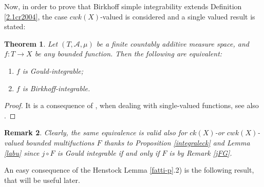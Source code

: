 \documentclass[11pt,a4paper,twoside]{amsart}
\newtheorem{theorem}{Theorem}[section]
\newtheorem{remark}[theorem]{Remark}
\begin{document}
Now,  in order to prove that Birkhoff simple integrability extends 
Definition \ref{2.1cr2004},
the  case $cwk(X)$-valued  is considered and  a single valued result is stated:
\begin{theorem}\label{partfinite}
Let $(T,\mathcal{A},\mu)$ be a finite countably additive measure space, and $f:T\to X$ be any bounded function. Then the following are equivalent:
\begin{enumerate}
\item $f$ is Gould-integrable;
\item $f$ is Birkhoff-integrable.
\end{enumerate}
\end{theorem}
\begin{proof}
It is a consequence of \cite[Theorems 15 and 16]{pot2007}, when dealing with single-valued functions, see also \cite[Theorem 5.1]{cg2014}.
\end{proof}

\begin{remark} \rm \label{bgmulti}
Clearly, the same equivalence is valid also for $ck(X)$-or $cwk(X)$-valued  bounded multifuctions $F$ 
thanks to Proposition \ref{integraleck} and Lemma \ref{labu} since $j \circ F$ is Gould integrable if and only if $F$ is by Remark \ref{jFG}.
\end{remark}

An easy consequence of the Henstock Lemma \ref{fatti-p}.2) is the following result, that will be useful later.
\end{document}
